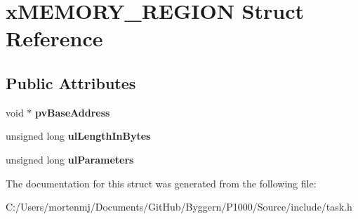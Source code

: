 \hypertarget{structx_m_e_m_o_r_y___r_e_g_i_o_n}{\section{x\-M\-E\-M\-O\-R\-Y\-\_\-\-R\-E\-G\-I\-O\-N Struct Reference}
\label{structx_m_e_m_o_r_y___r_e_g_i_o_n}
}
\subsection*{Public Attributes}
\begin{DoxyCompactItemize}
\item 
\hypertarget{structx_m_e_m_o_r_y___r_e_g_i_o_n_a228036bbfdbc38f170e45deadb166172}{void $\ast$ {\bfseries pv\-Base\-Address}}\label{structx_m_e_m_o_r_y___r_e_g_i_o_n_a228036bbfdbc38f170e45deadb166172}

\item 
\hypertarget{structx_m_e_m_o_r_y___r_e_g_i_o_n_ac296475c5bdf95765db1786789e3aa4d}{unsigned long {\bfseries ul\-Length\-In\-Bytes}}\label{structx_m_e_m_o_r_y___r_e_g_i_o_n_ac296475c5bdf95765db1786789e3aa4d}

\item 
\hypertarget{structx_m_e_m_o_r_y___r_e_g_i_o_n_a8750b0cad9c8b2c602ca9f0f2342b3aa}{unsigned long {\bfseries ul\-Parameters}}\label{structx_m_e_m_o_r_y___r_e_g_i_o_n_a8750b0cad9c8b2c602ca9f0f2342b3aa}

\end{DoxyCompactItemize}


The documentation for this struct was generated from the following file\-:\begin{DoxyCompactItemize}
\item 
C\-:/\-Users/mortenmj/\-Documents/\-Git\-Hub/\-Byggern/\-P1000/\-Source/include/task.\-h\end{DoxyCompactItemize}
